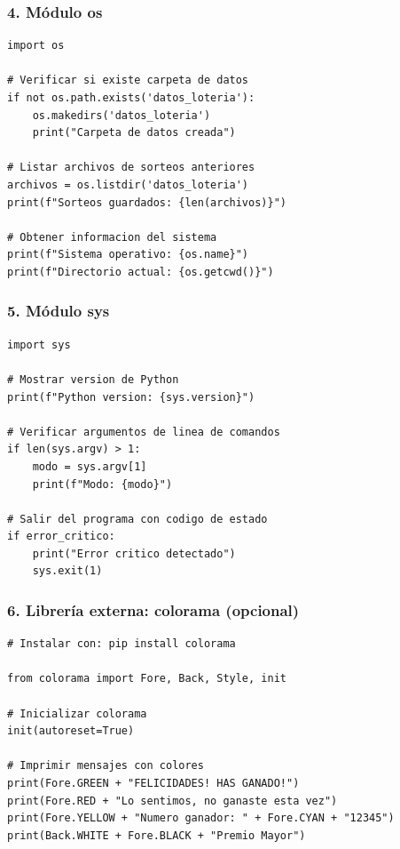 \documentclass[12pt,a4paper]{article}
\begin{document}
\subsubsection{4. Módulo os}

\begin{lstlisting}[caption=Uso de os para sistema de archivos]
import os

# Verificar si existe carpeta de datos
if not os.path.exists('datos_loteria'):
    os.makedirs('datos_loteria')
    print("Carpeta de datos creada")

# Listar archivos de sorteos anteriores
archivos = os.listdir('datos_loteria')
print(f"Sorteos guardados: {len(archivos)}")

# Obtener informacion del sistema
print(f"Sistema operativo: {os.name}")
print(f"Directorio actual: {os.getcwd()}")
\end{lstlisting}

\subsubsection{5. Módulo sys}

\begin{lstlisting}[caption=Uso de sys para informacion del sistema]
import sys

# Mostrar version de Python
print(f"Python version: {sys.version}")

# Verificar argumentos de linea de comandos
if len(sys.argv) > 1:
    modo = sys.argv[1]
    print(f"Modo: {modo}")

# Salir del programa con codigo de estado
if error_critico:
    print("Error critico detectado")
    sys.exit(1)
\end{lstlisting}

\subsubsection{6. Librería externa: colorama (opcional)}

\begin{lstlisting}[caption=Instalacion y uso de colorama para colores]
# Instalar con: pip install colorama

from colorama import Fore, Back, Style, init

# Inicializar colorama
init(autoreset=True)

# Imprimir mensajes con colores
print(Fore.GREEN + "FELICIDADES! HAS GANADO!")
print(Fore.RED + "Lo sentimos, no ganaste esta vez")
print(Fore.YELLOW + "Numero ganador: " + Fore.CYAN + "12345")
print(Back.WHITE + Fore.BLACK + "Premio Mayor")
\end{lstlisting}
\end{document}

